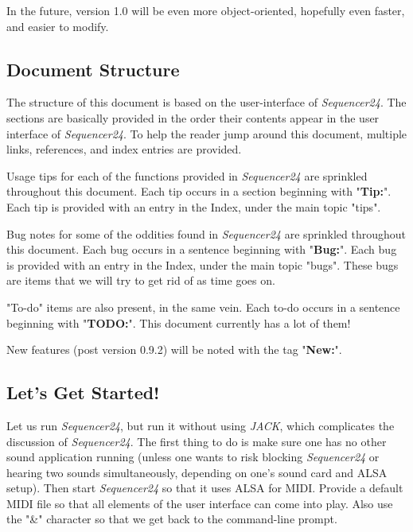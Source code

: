 \documentclass[
 11pt,
 twoside,
 a4paper,
 headinclude,
 footinclude,
 final                                 %
]{article}
\begin{document}
   In the future, version 1.0 will be even more object-oriented, hopefully
   even faster, and easier to modify.

\subsection{Document Structure}
\label{subsec:introduction_document_structure}

   The structure of this document is based on the user-interface of
   \textsl{Sequencer24}.  The sections are basically provided in the order
   their contents appear in the user interface of \textsl{Sequencer24}.  To
   help the reader jump around this document, multiple links, references,
   and index entries are provided.

   Usage tips
   for each of the functions provided in
   \textsl{Sequencer24} are sprinkled throughout this document.
   Each tip occurs in a section beginning with "\textbf{Tip:}".
   Each tip is provided with an entry in the Index, under the
   main topic "tips".

   Bug notes
   for some of the oddities found in \textsl{Sequencer24} are
   sprinkled throughout this document.
   Each bug occurs in a sentence beginning with "\textbf{Bug:}".
   Each bug is provided with an entry in the Index, under the
   main topic "bugs".  These bugs are items that we will try to
   get rid of as time goes on.

   "To-do" items
   are also present, in the same vein.
   Each to-do occurs in a sentence beginning with "\textbf{TODO:}".
   This document currently has a lot of them!

   New features (post version 0.9.2) will be noted with the tag
   "\textbf{New:}".

\subsection{Let's Get Started!}
\label{subsec:introduction_lets_get_started}

   Let us run \textsl{Sequencer24}, but run it without using \textsl{JACK},
   which complicates the discussion of \textsl{Sequencer24}.  The first
   thing to do is make sure one has no other sound application running
   (unless one wants to risk blocking \textsl{Sequencer24} or hearing two
    sounds simultaneously, depending on one's sound card and ALSA setup).
   Then start \textsl{Sequencer24} so that it uses ALSA for MIDI.  Provide a
   default MIDI file so that all elements of the user interface can come
   into play.  Also use the "\&" character so that we get back to the
   command-line prompt.
\end{document}
